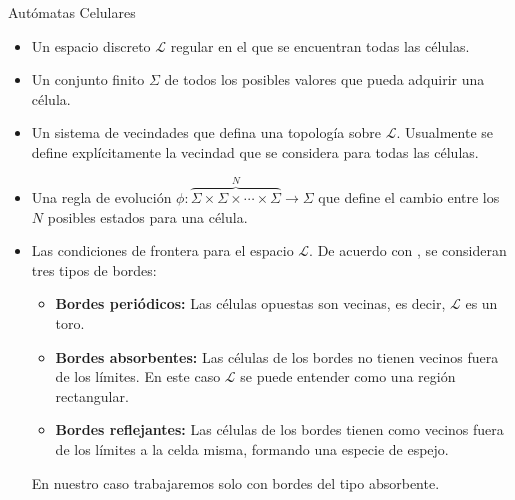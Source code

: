 \documentclass[9pt]{beamer}
\begin{document}
\begin{frame}{Autómatas Celulares}
\begin{itemize}
    \item Un espacio discreto $\mathcal{L}$ regular en el que se encuentran todas las células.
    \item Un conjunto finito $\Sigma$ de todos los posibles valores que pueda adquirir una célula.
    \item Un sistema de vecindades que defina una topología sobre $\mathcal{L}$. Usualmente se define explícitamente la vecindad que se considera para todas las células.
    \item Una regla de evolución $\phi:\overbrace{\Sigma\times\Sigma\times\cdots\times\Sigma}^{N}\to\Sigma$ que define el cambio entre los $N$ posibles estados para una célula.
    \item Las condiciones de frontera para el espacio $\mathcal{L}$. De acuerdo con \cite{ACaplicacionesComputacion}, se consideran tres tipos de bordes: 
    \begin{itemize}
        \item \textbf{Bordes periódicos:} Las células opuestas son vecinas, es decir, $\mathcal{L}$ es un toro.
        \item \textbf{Bordes absorbentes:} Las células de los bordes no tienen vecinos fuera de los límites. En este caso $\mathcal{L}$ se puede entender como una región rectangular.
        \item \textbf{Bordes reflejantes:} Las células de los bordes tienen como vecinos fuera de los límites a la celda misma, formando una especie de espejo.
    \end{itemize}
    En nuestro caso trabajaremos solo con bordes del tipo absorbente.
\end{itemize}
\end{frame}
\end{document}
